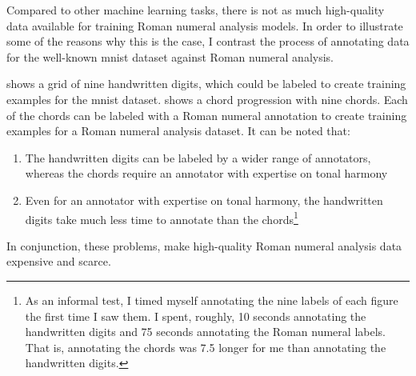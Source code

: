 

Compared to other machine learning tasks, there is not as
much high-quality data available for training Roman numeral
analysis models. In order to illustrate some of the reasons
why this is the case, I contrast the process of annotating
data for the well-known \gls{mnist} dataset
\parencite{lecun1989handwritten} against Roman numeral analysis.


 shows a grid of nine handwritten digits,
which could be labeled to create training examples for the \gls{mnist} dataset.
 shows a chord progression with nine chords.
Each of the chords can be labeled with a Roman numeral
annotation to create training examples for a Roman numeral analysis dataset. It can be noted
that:

\begin{enumerate}
    \item The handwritten digits can be labeled by a wider
    range of annotators, whereas the chords require an annotator with expertise on tonal harmony
    \item Even for an annotator with expertise on tonal harmony, the handwritten digits take much less time to annotate than the chords\footnote{As an informal test, I timed myself annotating the nine labels of each figure the first time I saw them. I spent, roughly, 10 seconds annotating the handwritten digits and 75 seconds annotating the Roman numeral labels. That is, annotating the chords was 7.5 longer for me than annotating the handwritten digits.}
\end{enumerate}

In conjunction, these problems, make high-quality Roman numeral analysis data expensive and scarce.


